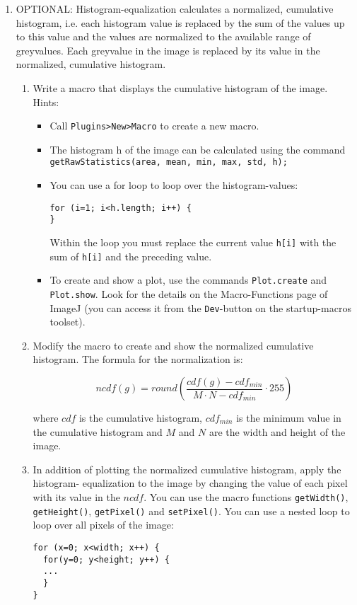 \begin{enumerate}
\item OPTIONAL: Histogram-equalization calculates a normalized, cumulative histogram, i.e. each histogram value is replaced by the sum of the values up to this value and the values are normalized to the available range of greyvalues. Each greyvalue in the image is replaced by its value in the normalized, cumulative histogram.

\begin{enumerate}[1]

\item Write a macro that displays the cumulative histogram of the image. Hints:

\begin{itemize}

\item Call \texttt{Plugins>New>Macro} to create a new macro.
\item The histogram h of the image can be calculated using the command \texttt{getRawStatistics(area, mean, min, max, std, h);}
\item You can use a for loop to loop over the histogram-values:

\begin{verbatim}
for (i=1; i<h.length; i++) {
}
\end{verbatim}

Within the loop you must replace the current value \texttt{h[i]} with the sum of \texttt{h[i]} and the preceding value.

\item To create and show a plot, use the commands \texttt{Plot.create} and \texttt{Plot.show}. Look for the details on the Macro-Functions page of ImageJ (you can access it from the \texttt{Dev}-button on the startup-macros toolset).

\end{itemize}
\item Modify the macro to create and show the normalized cumulative histogram. The formula for the normalization is:

\begin{equation}
 ncdf(g) = round(\frac{cdf(g)-cdf_{min}}{{M}\cdot{N}-cdf_{min}} \cdot 255)
\end{equation}

where $cdf$ is the cumulative histogram, $cdf_{min}$ is the minimum value in the cumulative histogram and $M$ and $N$ are the width and height of the image.

\item In addition of plotting the normalized cumulative histogram, apply the histogram-
equalization to the image by changing the value of each pixel with its value in the $ncdf$. You can use the macro functions \texttt{getWidth()}, \texttt{getHeight()}, \texttt{getPixel()} and \texttt{setPixel()}. You can use a nested loop to loop over all pixels of the image:
\begin{verbatim}
for (x=0; x<width; x++) {
  for(y=0; y<height; y++) {
  ...
  }
}
\end{verbatim}


\end{enumerate}
\end{enumerate}
